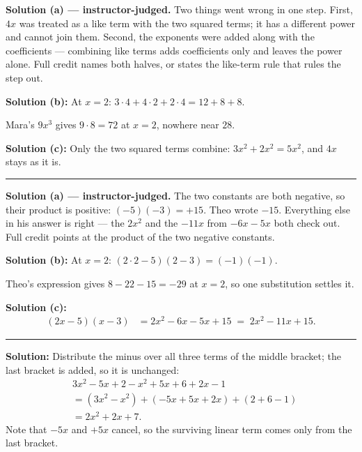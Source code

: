\documentclass[12pt]{article}
\begin{document}

\textbf{Solution (a) --- instructor-judged.} Two things went wrong in one step. First, $4x$ was
treated as a like term with the two squared terms; it has a different power and cannot join them.
Second, the exponents were added along with the coefficients --- combining like terms adds
coefficients only and leaves the power alone. Full credit names both halves, or states the
like-term rule that rules the step out.

\noindent\textbf{Solution (b):} \quad At $x = 2$: $3\cdot 4 + 4\cdot 2 + 2\cdot 4 = 12 + 8 + 8$. 

\noindent Mara's $9x^3$ gives $9\cdot 8 = 72$ at $x = 2$, nowhere near $28$.

\noindent\textbf{Solution (c):} \quad Only the two squared terms combine:
$3x^2 + 2x^2 = 5x^2$, and $4x$ stays as it is. 

\vspace{0.15cm}\noindent\rule{\linewidth}{0.2pt}


\textbf{Solution (a) --- instructor-judged.} The two constants are both negative, so their product
is positive: $(-5)(-3) = +15$. Theo wrote $-15$. Everything else in his answer is right --- the
$2x^2$ and the $-11x$ from $-6x - 5x$ both check out. Full credit points at the product of the two
negative constants.

\noindent\textbf{Solution (b):} \quad At $x = 2$: $(2\cdot 2 - 5)(2 - 3) = (-1)(-1)$. 

\noindent Theo's expression gives $8 - 22 - 15 = -29$ at $x = 2$, so one substitution settles it.

\noindent\textbf{Solution (c):}
\begin{align*}
  (2x - 5)(x - 3) &= 2x^2 - 6x - 5x + 15 \;=\; 2x^2 - 11x + 15.
\end{align*}

\vspace{0.15cm}\noindent\rule{\linewidth}{0.2pt}


\textbf{Solution:} \quad Distribute the minus over all three terms of the middle bracket; the last
bracket is added, so it is unchanged:
\begin{align*}
  &3x^2 - 5x + 2 - x^2 + 5x + 6 + 2x - 1\\
  &= (3x^2 - x^2) + (-5x + 5x + 2x) + (2 + 6 - 1)\\
  &= 2x^2 + 2x + 7.
\end{align*}
Note that $-5x$ and $+5x$ cancel, so the surviving linear term comes only from the last bracket.
\end{document}
